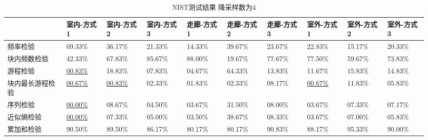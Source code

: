 \documentclass[master]{seuthesis} %
\begin{document}
\begin{Main}
\begin{table}[]
    \centering
    \tabulinesep=1.2mm        
    \begin{tabu}to \linewidth{X[c,m]X[c,m]X[c,m]X[c,m]X[c,m]X[c,m]X[c,m]X[c,m]X[c,m]X[c,m]}
        \toprule
        \textbf{} & \textbf{室内-方式1} & \textbf{室内-方式2} & \textbf{室内-方式3} & \textbf{走廊-方式1} & \textbf{走廊-方式2} & \textbf{走廊-方式3} & 
        \textbf{室外-方式1} & \textbf{室外-方式2} & \textbf{室外-方式3} \\
        \midrule
        频率检验 & 09.33\%    & 36.17\%    & 21.33\%    & 14.33\%    & 39.67\%    & 23.67\%    & 22.83\%    & 15.17\%    & 20.33\% \\
        块内频数检验 & 42.33\%    & 67.83\%    & 85.67\%    & 88.00\%    & 19.67\%    & 77.67\%    & 77.50\%    & 59.67\%    & 73.83\% \\
        游程检验 & \underline{00.83\%}    & 18.83\%    & 07.83\%    & 04.67\%    & 64.33\%    & 13.83\%    & 11.67\%    & 15.83\%    & 14.83\% \\
        块内最长游程检验 & \underline{00.67\%}    & \underline{00.83\%}    & 02.33\%    & 01.83\%    & 02.33\%    & 08.17\%    & \underline{00.67\%}    & 11.83\%    & 05.83\% \\
        序列检验 & \underline{00.00\%}    & 08.67\%    & 04.50\%    & 03.67\%    & 31.50\%    & 08.00\%    & 03.67\%    & 07.33\%    & 07.17\% \\
        近似熵检验 & \underline{00.00\%}    & 07.33\%    & 05.00\%    & 03.50\%    & 38.67\%    & 08.33\%    & 03.67\%    & 07.00\%    & 05.83\% \\
        累加和检验 & 90.50\%    & 89.50\%    & 86.17\%    & 80.17\%    & 80.17\%    & 90.83\%    & 88.17\%    & 95.33\%    & 90.00\% \\
        \bottomrule
    \end{tabu}
    \caption{NIST测试结果 降采样数为4
    \label{NIST_test_result_4}}
\end{table}



\end{Main}
\end{document}
